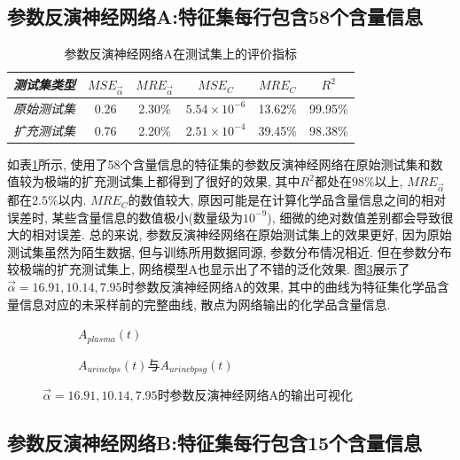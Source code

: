 \documentclass[a4paper,punct=banjiao,twoside]{ctexrep}
\theoremstyle{plain}
\theoremstyle{definition}
\theoremstyle{remark}
\begin{document}
\subsection*{参数反演神经网络A:特征集每行包含58个含量信息}
\begin{table}[htbp]
  \centering
  \begin{tabular}[t]{l*{5}{c}}
    \hline
    \textit{测试集类型} &$MSE_{\vec{\alpha}}$&$MRE_{\vec{\alpha}}$ & $MSE_{C}$& $MRE_{C}$& $R^2$\\
    \hline
    \textit{原始测试集} &  0.26   &   2.30\%     &   $5.54\times 10^{-6}$     &  13.62\%     &  99.95\%  \\ 
    \textit{扩充测试集} &  0.76   &   2.20\%     &   $2.51\times 10^{-4}$     &  39.45\%     &  98.38\%  \\ 
    \hline
  \end{tabular}
  \caption{\label{tab4.1}参数反演神经网络A在测试集上的评价指标} 
\end{table}  
如表\ref{tab4.1}所示, 使用了58个含量信息的特征集的参数反演神经网络在原始测试集和数值较为极端的扩充测试集上都得到了很好的效果, 其中$R^2$都处在$98\%$以上, $MRE_{\vec{\alpha}}$都在$2.5\%$以内.
$MRE_{C}$的数值较大, 原因可能是在计算化学品含量信息之间的相对误差时, 某些含量信息的数值极小(数量级为$10^{-9}$), 细微的绝对数值差别都会导致很大的相对误差. 
总的来说, 参数反演神经网络在原始测试集上的效果更好, 因为原始测试集虽然为陌生数据, 但与训练所用数据同源, 参数分布情况相近. 但在参数分布较极端的扩充测试集上, 网络模型A也显示出了不错的泛化效果.
图\ref{反演A}展示了$\vec{\alpha}=16.91,10.14,7.95$时参数反演神经网络A的效果, 其中的曲线为特征集化学品含量信息对应的未采样前的完整曲线, 散点为网络输出的化学品含量信息.
\begin{figure}[H]
  \centering
  \begin{subfigure}{0.45\textwidth}
    \centering
    \resizebox{1\textwidth}{!}{}
    \label{反演A1}
    \caption{$A_{plasma}(t)$}
  \end{subfigure}
  \begin{subfigure}{0.45\textwidth}
    \centering
    \resizebox{1\textwidth}{!}{}
    \label{反演A2}
    \caption{$A_{urinebps}(t)$与$A_{urinebpsg}(t)$}
  \end{subfigure}
  \caption{$\vec{\alpha}=16.91,10.14,7.95$时参数反演神经网络A的输出可视化}
  \label{反演A}
\end{figure}

\subsection*{参数反演神经网络B:特征集每行包含15个含量信息}
\end{document}
